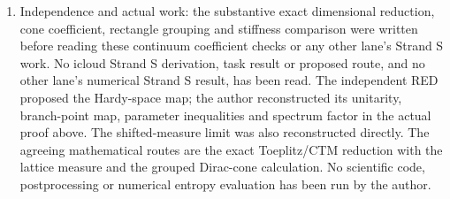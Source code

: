 \documentclass[10pt]{article}
\begin{document}
\begin{enumerate}[leftmargin=*]
equations (6)--(10), (18)--(23), (28) and section 4.4;
\emph{Black Hole Entropy and Renormalization},
\href{https://arxiv.org/abs/gr-qc/9507042}{arXiv:gr-qc/9507042},
equations (2.3)--(2.8), (3.5)--(3.9).
Actual texts:
 and
.
They concern covariantly regulated scalar fields and do not supply
the native sine cut or its polar stiffness.
V.~P.~Frolov, D.~V.~Fursaev and A.~I.~Zelnikov,
\emph{Statistical Origin of Black Hole Entropy in Induced Gravity},
\href{https://arxiv.org/abs/hep-th/9607104}{arXiv:hep-th/9607104},
equations (2.1)--(2.19), (3.2)--(3.12), (4.26)--(4.30), in
.
The Dirac factor, common regulator and scalar contact subtraction
are retained at their stated scopes.
\item Independence and actual work: the substantive exact
dimensional reduction, cone coefficient, rectangle grouping and
stiffness comparison were written before reading these continuum
coefficient checks or any other lane's Strand S work. No icloud
Strand S derivation, task result or proposed route, and no other
lane's numerical Strand S result, has been read. The independent
RED proposed the Hardy-space map; the author reconstructed its
unitarity, branch-point map, parameter inequalities and spectrum
factor in the actual proof above. The shifted-measure limit was
also reconstructed directly. The agreeing mathematical routes are
the exact Toeplitz/CTM reduction with the lattice measure and the
grouped Dirac-cone calculation. No scientific code, postprocessing
or numerical entropy evaluation has been run by the author.
\end{enumerate}
\end{document}
